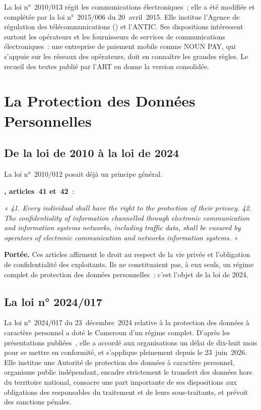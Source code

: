 La loi n°~2010/013 régit les communications électroniques~; elle a été
modifiée et complétée par la loi n°~2015/006 du 20~avril~2015. Elle
institue l'Agence de régulation des télécommunications () et
l'ANTIC. Ses dispositions intéressent surtout les opérateurs et les
fournisseurs de services de communications électroniques~: une
entreprise de paiement mobile comme NOUN PAY, qui s'appuie sur les
réseaux des opérateurs, doit en connaître les grandes règles. Le recueil
des textes publié par l'ART en donne la version consolidée.

\section{La Protection des Données Personnelles}
\label{sec:c10-donnees}

\subsection{De la loi de 2010 à la loi de 2024}

La loi n°~2010/012 posait déjà un principe général.

\begin{boxjuris}
\textbf{, articles~41 et~42}~:

\medskip
\textit{« 41. Every individual shall have the right to the protection of
their privacy. \textelp{} 42. The confidentiality of information
channelled through electronic communication and information systems
networks, including traffic data, shall be ensured by operators of
electronic communication and networks information systems. »}

\medskip
\textbf{Portée.} Ces articles affirment le droit au respect de la vie
privée et l'obligation de confidentialité des exploitants. Ils ne
constituaient pas, à eux seuls, un régime complet de protection des
données personnelles~: c'est l'objet de la loi de 2024.
\end{boxjuris}

\subsection{La loi n° 2024/017}

La loi n°~2024/017 du 23~décembre~2024 relative à la protection des
données à caractère personnel a doté le Cameroun d'un régime complet.
D'après les présentations publiées~\cite{cio2026donnees}, elle a accordé
aux organisations un délai de dix-huit mois pour se mettre en conformité,
et s'applique pleinement depuis le 23~juin~2026. Elle institue une
Autorité de protection des données à caractère personnel, organisme
public indépendant, encadre strictement le transfert des données hors du
territoire national, consacre une part importante de ses dispositions aux
obligations des responsables du traitement et de leurs sous-traitants,
et prévoit des sanctions pénales.

